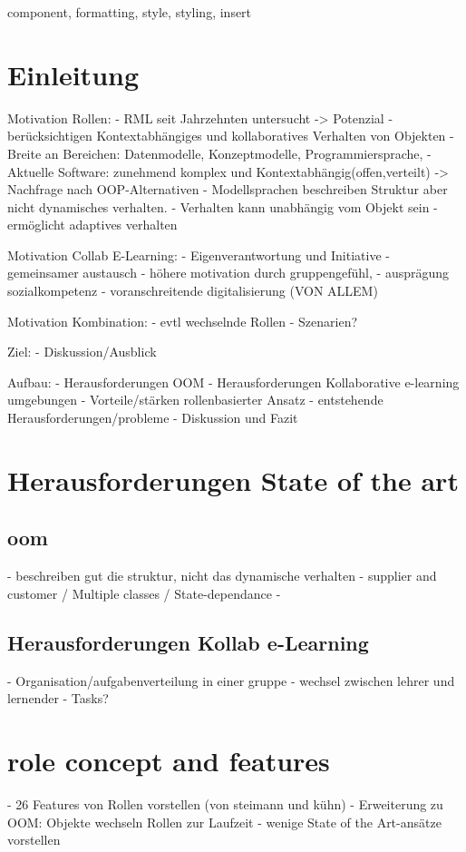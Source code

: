 \documentclass[conference]{IEEEtran}
\begin{document}
\begin{IEEEkeywords}
component, formatting, style, styling, insert
\end{IEEEkeywords}

\section{Einleitung}
Motivation Rollen:
- RML seit Jahrzehnten untersucht -> Potenzial
- berücksichtigen Kontextabhängiges und kollaboratives Verhalten von Objekten
- Breite an Bereichen: Datenmodelle, Konzeptmodelle, Programmiersprache,
- Aktuelle Software: zunehmend komplex und Kontextabhängig(offen,verteilt) -> Nachfrage nach OOP-Alternativen
- Modellsprachen beschreiben Struktur aber nicht dynamisches verhalten.
- Verhalten kann unabhängig vom Objekt sein
- ermöglicht adaptives verhalten

Motivation  Collab E-Learning:
- Eigenverantwortung und Initiative
- gemeinsamer austausch
- höhere motivation durch gruppengefühl, 
- ausprägung sozialkompetenz
- voranschreitende digitalisierung (VON ALLEM) 

Motivation Kombination:
- evtl wechselnde Rollen
- Szenarien? 

Ziel:
- Diskussion/Ausblick

Aufbau:
- Herausforderungen OOM
- Herausforderungen Kollaborative e-learning umgebungen
- Vorteile/stärken rollenbasierter Ansatz
- entstehende Herausforderungen/probleme
- Diskussion und Fazit


\section{Herausforderungen State of the art}
\subsection{oom}
- beschreiben gut die struktur, nicht das dynamische verhalten
- supplier and customer / Multiple classes / State-dependance
- 
\subsection{Herausforderungen Kollab e-Learning}
- Organisation/aufgabenverteilung in einer gruppe
- wechsel zwischen lehrer und lernender
- Tasks? 

\section{role concept and features}
- 26 Features von Rollen vorstellen (von steimann und kühn)
- Erweiterung zu OOM: Objekte wechseln Rollen zur Laufzeit
- wenige State of the Art-ansätze vorstellen
\end{document}
